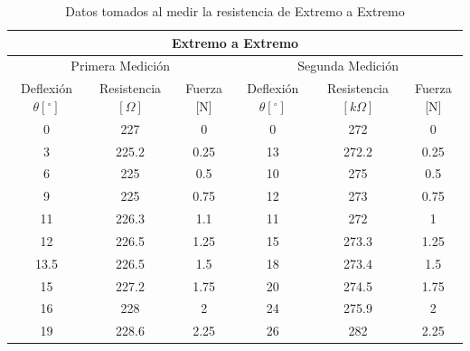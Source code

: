 \documentclass{article}
\begin{document}
\begin{table}[h]
	\centering
	\begin{tabular}{|c|c|c|c|c|c|}
		\hline
		\multicolumn{6}{|c|}{Extremo a Extremo}\\\hline
		\multicolumn{3}{|c|}{Primera Medición}&
		\multicolumn{3}{c|}{Segunda Medición}\\\hline
		Deflexión  $\theta[^\circ]$&Resistencia $[\Omega]$& Fuerza [N]&Deflexión  $\theta[^\circ]$&Resistencia $[k\Omega]$& Fuerza [N]\\\hline
		0	&227	&0		&0		&272	&0\\\hline
		3	&225.2	&0.25	&13		&272.2	&0.25\\\hline
		6	&225	&0.5	&10		&275	&0.5\\\hline
		9	&225	&0.75	&12		&273	&0.75\\\hline
		11	&226.3	&1.1	&11		&272	&1\\\hline
		12	&226.5	&1.25	&15		&273.3	&1.25\\\hline
		13.5&226.5	&1.5	&18		&273.4	&1.5\\\hline
		15	&227.2	&1.75	&20		&274.5	&1.75\\\hline
		16	&228	&2		&24		&275.9	&2\\\hline
		19	&228.6	&2.25	&26		&282	&2.25\\\hline
	\end{tabular}
	\caption{Datos tomados al medir la resistencia de Extremo a Extremo}
	\label{Tab:E-E}
\end{table}

\lipsum
\lipsum
\end{document}

